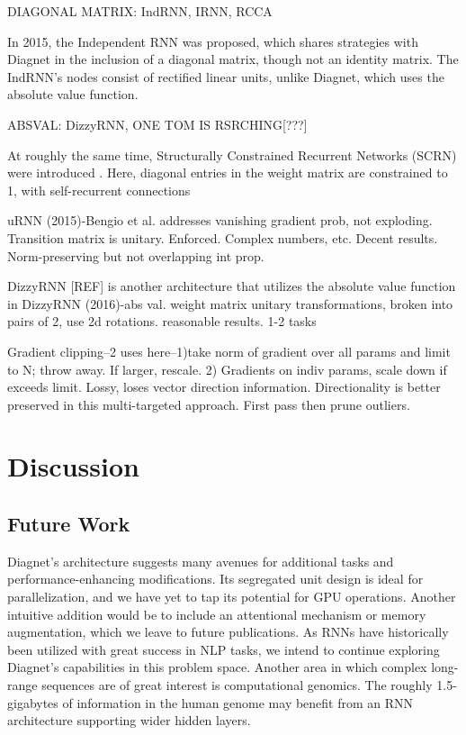 \documentclass{article}
\begin{document}
DIAGONAL MATRIX: IndRNN, IRNN, RCCA

In 2015, the Independent RNN \citet{DBLP:journals/corr/LeJH15} was proposed, which shares strategies with Diagnet in the inclusion of a diagonal matrix, though not an identity matrix. The IndRNN's nodes consist of rectified linear units, unlike Diagnet, which uses the absolute value function.

ABSVAL: DizzyRNN, ONE TOM IS RSRCHING[???]

At roughly the same time, Structurally Constrained Recurrent Networks (SCRN) were introduced \citet{DBLP:journals/corr/MikolovJCMR14}. Here, diagonal entries in the weight matrix are constrained to 1, with self-recurrent connections

uRNN (2015)-Bengio et al.  addresses vanishing gradient prob, not exploding.  Transition matrix is unitary.  Enforced.  Complex numbers, etc. Decent results. Norm-preserving but not overlapping int prop.

DizzyRNN [REF] is another architecture that utilizes the absolute value function in 
DizzyRNN (2016)-abs val. weight matrix unitary transformations, broken into pairs of 2, use 2d rotations. reasonable results. 1-2 tasks 

Gradient clipping--2 uses here--1)take norm of gradient over all params and limit to N; throw away.  If larger, rescale.  2) Gradients on indiv params, scale down if exceeds limit.  Lossy, loses vector direction information. Directionality is better preserved in this multi-targeted approach. First pass then prune outliers.   


\section{Discussion}
\subsection{Future Work}
Diagnet's architecture suggests many avenues for additional tasks and performance-enhancing modifications.  Its segregated unit design is ideal for parallelization, and we have yet to tap its potential for GPU operations.  Another intuitive addition would be to include an attentional mechanism or memory augmentation, which we leave to future publications.  
As RNNs have historically been utilized with great success in NLP tasks, we intend to continue exploring Diagnet's capabilities in this problem space.  Another area in which complex long-range sequences are of great interest is computational genomics. The roughly 1.5-gigabytes of information in the human genome may benefit from an RNN architecture supporting wider hidden layers.  
\end{document}
